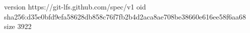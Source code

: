 version https://git-lfs.github.com/spec/v1
oid sha256:d35e0bfd9efa58628db858c76f7fb2b4d2aca8ae708be38660e616ee58f6aa68
size 3922
